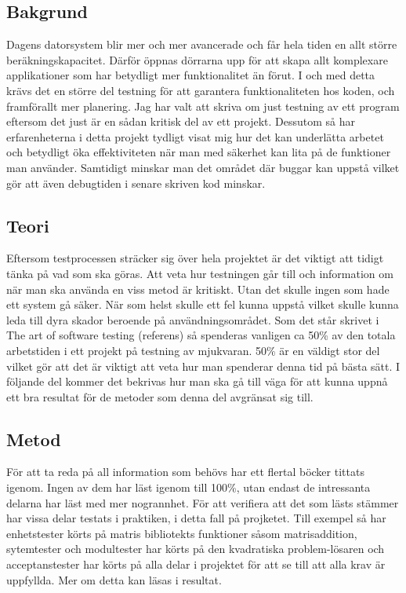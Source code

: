 	\subsection{Bakgrund}	
	Dagens datorsystem blir mer och mer avancerade och får hela tiden en allt större beräkningskapacitet. Därför öppnas dörrarna upp för att skapa allt komplexare applikationer som har betydligt mer funktionalitet än förut. I och med detta krävs det en större del testning för att garantera funktionaliteten hos koden, och framförallt mer planering. \newline
	Jag har valt att skriva om just testning av ett program eftersom det just är en sådan kritisk del av ett projekt. Dessutom så har erfarenheterna i detta projekt tydligt visat mig hur det kan underlätta arbetet och betydligt öka effektiviteten när man med säkerhet kan lita på de funktioner man använder. Samtidigt minskar man det området där buggar kan uppstå vilket gör att även debugtiden i senare skriven kod minskar. \newline	
	
	\subsection{Teori}
	Eftersom testprocessen sträcker sig över hela projektet är det viktigt att tidigt tänka på vad som ska göras. Att veta hur testningen går till och information om när man ska använda en viss metod är kritiskt. Utan det skulle ingen som hade ett system gå säker. När som helst skulle ett fel kunna uppstå vilket skulle kunna leda till dyra skador beroende på användningsområdet. \newline
	Som det står skrivet i The art of software testing (referens) så spenderas vanligen ca 50\% av den totala arbetstiden i ett projekt på testning av mjukvaran. 50\% är en väldigt stor del vilket gör att det är viktigt att veta hur man spenderar denna tid på bästa sätt. I följande del kommer det bekrivas hur man ska gå till väga för att kunna uppnå ett bra resultat för de metoder som denna del avgränsat sig till.
	
	\subsection{Metod}
	För att ta reda på all information som behövs har ett flertal böcker tittats igenom. Ingen av dem har läst igenom till 100\%, utan endast de intressanta delarna har läst med mer nogrannhet. För att verifiera att det som lästs stämmer har vissa delar testats i praktiken, i detta fall på projketet. Till exempel så har enhetstester körts på matris bibliotekts funktioner såsom matrisaddition, sytemtester och modultester har körts på den kvadratiska problem-lösaren och acceptanstester har körts på alla delar i projektet för att se till att alla krav är uppfyllda. Mer om detta kan läsas i resultat.
	
